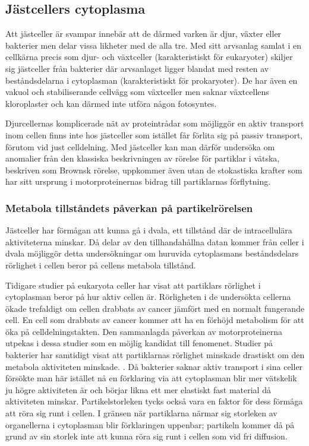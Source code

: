 \subsection{Jästcellers cytoplasma}

Att jästceller är svampar innebär att de därmed varken är djur, växter eller bakterier men delar vissa likheter med de alla tre. Med sitt arvsanlag samlat i en cellkärna precis som djur- och växtceller (karakteristiskt för eukaryoter) skiljer sig jästceller från bakterier där arvsanlaget ligger blandat med resten av beståndsdelarna i cytoplasman (karakteristiskt för prokaryoter). \cite{Yeast} De har även en vakuol och stabiliserande cellvägg som växtceller men saknar växtcellens kloroplaster och kan därmed inte utföra någon fotosyntes.

Djurcellernas komplicerade nät av proteintrådar som möjliggör en aktiv transport inom cellen finns inte hos jästceller som istället får förlita sig på passiv transport, förutom vid just celldelning. Med jästceller kan man därför undersöka om anomalier från den klassiska beskrivningen av rörelse för partiklar i vätska, beskriven som Brownsk rörelse, uppkommer även utan de stokastiska krafter som har sitt ursprung i motorproteinernas bidrag till partiklarnas förflytning.

\subsubsection{Metabola tillståndets påverkan på partikelrörelsen}

Jästceller har förmågan att kunna gå i dvala, ett tillstånd där de intracellulära aktiviteterna minskar. Då delar av den tillhandahållna datan kommer från celler i dvala möjliggör detta undersökningar om huruvida cytoplasmans beståndsdelars rörlighet i cellen beror på cellens metabola tillstånd.

Tidigare studier på eukaryota celler har visat att partiklars rörlighet i cytoplasman beror på hur aktiv cellen är.\cite{Gou_etal2014} Rörligheten i de undersökta cellerna ökade trefaldigt om cellen drabbats av cancer jämfört med en normalt fungerande cell. En cell som drabbats av cancer kommer att ha en förhöjd metabolism för att öka på celldelningstakten. Den sammanlagda påverkan av motorproteinerna utpekas i dessa studier som en möjlig kandidat till fenomenet. Studier på bakterier har samtidigt visat att partiklarnas rörlighet minskade drastiskt om den metabola aktiviteten minskade. \cite{Parry_etal2014}. Då bakterier saknar aktiv transport i sina celler försökte man här istället nå en förklaring via att cytoplasman blir mer vätskelik ju högre aktiviteten är och börjar likna ett mer elastiskt fast material då aktiviteten minskar. Partikelstorleken tycks också vara en faktor för dess förmåga att röra sig runt i cellen. I gränsen när partiklarna närmar sig storleken av organellerna i cytoplasman blir förklaringen uppenbar; partikeln kommer då på grund av sin storlek inte att kunna röra sig runt i cellen som vid fri diffusion.


